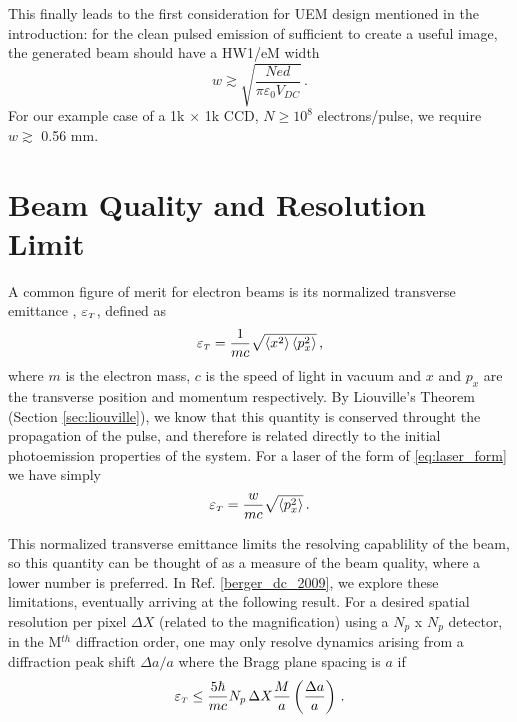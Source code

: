 This finally leads to the first consideration for UEM design mentioned in the introduction: for the clean pulsed emission of sufficient to create a useful image, the generated beam should have a HW1/eM width 
\begin{equation}
  w \gtrsim \sqrt{\frac{N e d}{\pi \varepsilon_0 V_{DC}}} \,\text{.}
\end{equation}
For our example case of a 1k $\times$ 1k CCD, $N \ge 10^8$ electrons/pulse, we require $w \gtrsim $ 0.56 mm.

\section{Beam Quality and Resolution Limit}

A common figure of merit for electron beams is its normalized transverse emittance \cite{jensen_emittance_2010}, $\varepsilon_{{\scriptscriptstyle T}}$, defined as 
\begin{equation} \label{eq:emittance_definition}
  \varepsilon_{{\scriptscriptstyle T}} = \frac{1}{m c} \sqrt{ \left < x^2 \right > \left < p_x^2 \right > } \,\text{,}
\end{equation}
where $m$ is the electron mass, $c$ is the speed of light in vacuum and $x$ and $p_x$ are the transverse position and momentum respectively.
By Liouville's Theorem (Section \ref{sec:liouville}), we know that this quantity is conserved throught the propagation of the pulse, and therefore is related directly to the initial photoemission properties of the system.
For a laser of the form of \ref{eq:laser_form} we have simply
\begin{equation} \label{eq:emittance_definition_w}
  \varepsilon_{{\scriptscriptstyle T}} = \frac{w}{m c} \sqrt{ \left < p_x^2 \right > } \,\text{.}
\end{equation}

This normalized transverse emittance limits the resolving capablility of the beam, so this quantity can be thought of as a measure of the beam quality, where a lower number is preferred.
In Ref. \ref{berger_dc_2009}, we explore these limitations, eventually arriving at the following result.
For a desired spatial resolution per pixel $\Delta X$ (related to the magnification) using a $N_p$ x $N_p$ detector, in the M$^{th}$ diffraction order, one may only resolve dynamics arising from a diffraction peak shift $\Delta a / a$ where the Bragg plane spacing is $a$ if 
\begin{equation}
  \varepsilon_{{\scriptscriptstyle T}} \le \frac{5 \hbar}{m c} N_p \, \Delta X \frac{M}{a} \left ( \frac{\Delta a}{a} \right ) \,\text{.}
\end{equation}
